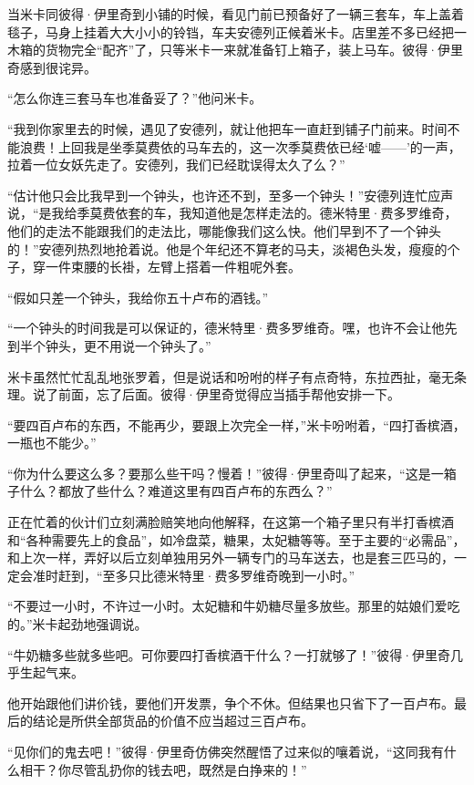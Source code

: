 \par 当米卡同彼得·伊里奇到小铺的时候，看见门前已预备好了一辆三套车，车上盖着毯子，马身上挂着大大小小的铃铛，车夫安德列正候着米卡。店里差不多已经把一木箱的货物完全“配齐”了，只等米卡一来就准备钉上箱子，装上马车。彼得·伊里奇感到很诧异。
\par “怎么你连三套马车也准备妥了？”他问米卡。
\par “我到你家里去的时候，遇见了安德列，就让他把车一直赶到铺子门前来。时间不能浪费！上回我是坐季莫费依的马车去的，这一次季莫费依已经‘嘘——’的一声，拉着一位女妖先走了。安德列，我们已经耽误得太久了么？”
\par “估计他只会比我早到一个钟头，也许还不到，至多一个钟头！”安德列连忙应声说，“是我给季莫费依套的车，我知道他是怎样走法的。德米特里·费多罗维奇，他们的走法不能跟我们的走法比，哪能像我们这么快。他们早到不了一个钟头的！”安德列热烈地抢着说。他是个年纪还不算老的马夫，淡褐色头发，瘦瘦的个子，穿一件束腰的长褂，左臂上搭着一件粗呢外套。
\par “假如只差一个钟头，我给你五十卢布的酒钱。”
\par “一个钟头的时间我是可以保证的，德米特里·费多罗维奇。嘿，也许不会让他先到半个钟头，更不用说一个钟头了。”
\par 米卡虽然忙忙乱乱地张罗着，但是说话和吩咐的样子有点奇特，东拉西扯，毫无条理。说了前面，忘了后面。彼得·伊里奇觉得应当插手帮他安排一下。
\par “要四百卢布的东西，不能再少，要跟上次完全一样，”米卡吩咐着，“四打香槟酒，一瓶也不能少。”
\par “你为什么要这么多？要那么些干吗？慢着！”彼得·伊里奇叫了起来，“这是一箱子什么？都放了些什么？难道这里有四百卢布的东西么？”
\par 正在忙着的伙计们立刻满脸赔笑地向他解释，在这第一个箱子里只有半打香槟酒和“各种需要先上的食品”，如冷盘菜，糖果，太妃糖等等。至于主要的“必需品”，和上次一样，弄好以后立刻单独用另外一辆专门的马车送去，也是套三匹马的，一定会准时赶到，“至多只比德米特里·费多罗维奇晚到一小时。”
\par “不要过一小时，不许过一小时。太妃糖和牛奶糖尽量多放些。那里的姑娘们爱吃的。”米卡起劲地强调说。
\par “牛奶糖多些就多些吧。可你要四打香槟酒干什么？一打就够了！”彼得·伊里奇几乎生起气来。
\par 他开始跟他们讲价钱，要他们开发票，争个不休。但结果也只省下了一百卢布。最后的结论是所供全部货品的价值不应当超过三百卢布。
\par “见你们的鬼去吧！”彼得·伊里奇仿佛突然醒悟了过来似的嚷着说，“这同我有什么相干？你尽管乱扔你的钱去吧，既然是白挣来的！”
